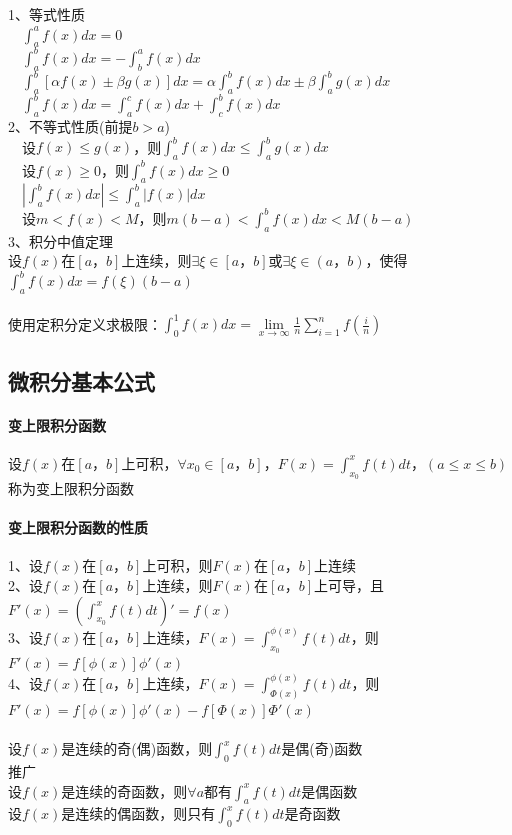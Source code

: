 \documentclass{article}
\begin{document}
\begin{flushleft}
	1、等式性质\\
	\ \ $\int_{a}^{a}f(x)dx=0$\\
	\ \ $\int_{a}^{b}f(x)dx=-\int_{b}^{a}f(x)dx$\\
	\ \ $\int_{a}^{b}[\alpha f(x)\pm \beta g(x)]dx=\alpha\int_{a}^{b}f(x)dx\pm \beta\int_{a}^{b}g(x)dx$\\
	\ \ $\int_{a}^{b}f(x)dx=\int_{a}^{c}f(x)dx+\int_{c}^{b}f(x)dx$\\
	2、不等式性质(前提$b>a$)\\
	\ \ 设$f(x)\le g(x)$，则$\int_{a}^{b}f(x)dx\le \int_{a}^{b}g(x)dx$\\
	\ \ 设$f(x)\ge 0$，则$\int_{a}^{b}f(x)dx \ge 0$\\
	\ \ $|\int_{a}^{b}f(x)dx| \le \int_{a}^{b}|f(x)|dx$\\
	\ \ 设$m<f(x)<M$，则$m(b-a)<\int_{a}^{b}f(x)dx<M(b-a)$\\
	3、积分中值定理\\
	设$f(x)$在$[a，b]$上连续，则$\exists \xi \in [a，b]$或$\exists \xi \in (a，b)$，使得$\int_{a}^{b}f(x)dx=f(\xi)(b-a)$\\
	~\\
	使用定积分定义求极限：$\int_{0}^{1}f(x)dx=\lim\limits_{x\to \infty}\frac{1}{n}\sum_{i=1}^{n}f(\frac{i}{n})$\\
	
	\subsection{微积分基本公式}
	
	\paragraph{变上限积分函数}
	设$f(x)$在$[a，b]$上可积，$\forall x_0\in [a，b]$，$F(x)=\int_{x_0}^{x}f(t)dt，(a\le x\le b)$称为变上限积分函数\\
	\paragraph{变上限积分函数的性质}
	1、设$f(x)$在$[a，b]$上可积，则$F(x)$在$[a，b]$上连续\\
	2、设$f(x)$在$[a，b]$上连续，则$F(x)$在$[a，b]$上可导，且$F'(x)=(\int_{x_0}^{x}f(t)dt)'=f(x)$\\
	3、设$f(x)$在$[a，b]$上连续，$F(x)=\int_{x_0}^{\phi(x)}f(t)dt$，则$F'(x)=f[\phi(x)]\phi'(x)$\\
	4、设$f(x)$在$[a，b]$上连续，$F(x)=\int_{\Phi(x)}^{\phi(x)}f(t)dt$，则$F'(x)=f[\phi(x)]\phi'(x)-f[\Phi(x)]\Phi'(x)$\\
	~\\
	设$f(x)$是连续的奇(偶)函数，则$\int_{0}^{x}f(t)dt$是偶(奇)函数\\
	推广\\
	设$f(x)$是连续的奇函数，则$\forall a$都有$\int_{a}^{x}f(t)dt$是偶函数\\
	设$f(x)$是连续的偶函数，则只有$\int_{0}^{x}f(t)dt$是奇函数\\

\end{flushleft}
\end{document}
